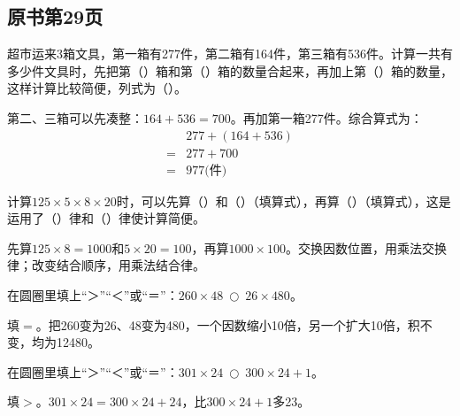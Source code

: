 

\subsection*{原书第29页}

超市运来3箱文具，第一箱有277件，第二箱有164件，第三箱有536件。计算一共有多少件文具时，先把第（\hspace{1.8em}）箱和第（\hspace{1.8em}）箱的数量合起来，再加上第（\hspace{1.8em}）箱的数量，这样计算比较简便，列式为（\hspace{1.8em}）。\par
\begin{BookAnswer}
第二、三箱可以先凑整：\(164+536=700\)。再加第一箱277件。综合算式为：\[\begin{aligned} &277+(164+536)\\={}&277+700\\={}&977\text{(件)}\end{aligned}\]
\end{BookAnswer}

计算\(125\times5\times8\times20\)时，可以先算（\hspace{1.8em}）和（\hspace{1.8em}）（填算式），再算（\hspace{1.8em}）（填算式），这是运用了（\hspace{1.8em}）律和（\hspace{1.8em}）律使计算简便。\par
\begin{BookAnswer}
先算\(125\times8=1000\)和\(5\times20=100\)，再算\(1000\times100\)。交换因数位置，用乘法交换律；改变结合顺序，用乘法结合律。
\end{BookAnswer}

在圆圈里填上“＞”“＜”或“＝”：\(260\times48\ \bigcirc\ 26\times480\)。\par
\begin{BookAnswer}
填\(=\)。把260变为26、48变为480，一个因数缩小10倍，另一个扩大10倍，积不变，均为12480。
\end{BookAnswer}

在圆圈里填上“＞”“＜”或“＝”：\(301\times24\ \bigcirc\ 300\times24+1\)。\par
\begin{BookAnswer}
填\(>\)。\(301\times24=300\times24+24\)，比\(300\times24+1\)多23。
\end{BookAnswer}

